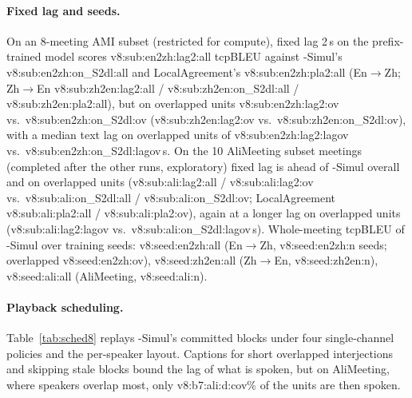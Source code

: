 \paragraph{Fixed lag and seeds.} On an 8-meeting AMI subset (restricted for compute), fixed lag 2\,s on the
prefix-trained model scores \num{v8:sub:en2zh:lag2:all} tcpBLEU against \sys{}-Simul's \num{v8:sub:en2zh:on_S2dl:all} and
LocalAgreement's \num{v8:sub:en2zh:pla2:all} (En$\rightarrow$Zh; Zh$\rightarrow$En \num{v8:sub:zh2en:lag2:all} /
\num{v8:sub:zh2en:on_S2dl:all} / \num{v8:sub:zh2en:pla2:all}), but on overlapped units \num{v8:sub:en2zh:lag2:ov} vs.\
\num{v8:sub:en2zh:on_S2dl:ov} (\num{v8:sub:zh2en:lag2:ov} vs.\ \num{v8:sub:zh2en:on_S2dl:ov}), with a median text lag on
overlapped units of \num{v8:sub:en2zh:lag2:lagov} vs.\ \num{v8:sub:en2zh:on_S2dl:lagov}\,s. On the 10 AliMeeting subset
meetings (completed after the other runs, exploratory) fixed lag is ahead of \sys{}-Simul overall
and on overlapped units (\num{v8:sub:ali:lag2:all} / \num{v8:sub:ali:lag2:ov} vs.\ \num{v8:sub:ali:on_S2dl:all} /
\num{v8:sub:ali:on_S2dl:ov}; LocalAgreement \num{v8:sub:ali:pla2:all} / \num{v8:sub:ali:pla2:ov}), again at a longer lag on
overlapped units (\num{v8:sub:ali:lag2:lagov} vs.\ \num{v8:sub:ali:on_S2dl:lagov}\,s). Whole-meeting tcpBLEU of
\sys{}-Simul over training seeds: \num{v8:seed:en2zh:all} (En$\rightarrow$Zh, \num{v8:seed:en2zh:n} seeds; overlapped
\num{v8:seed:en2zh:ov}), \num{v8:seed:zh2en:all} (Zh$\rightarrow$En, \num{v8:seed:zh2en:n}), \num{v8:seed:ali:all}
(AliMeeting, \num{v8:seed:ali:n}).

\paragraph{Playback scheduling.} Table~\ref{tab:sched8} replays \sys{}-Simul's committed blocks under four single-channel
policies and the per-speaker layout. Captions for short overlapped interjections and skipping stale blocks bound the lag
of what is spoken, but on AliMeeting, where speakers overlap most, only \num{v8:b7:ali:d:cov}\% of the units are then
spoken.




